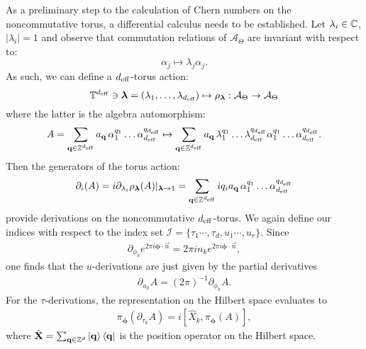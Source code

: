 \documentclass[
    aps,
    prb,
    twocolumn,
    floatfix,
    superscriptaddress,
	10pt
]{revtex4-2}
\begin{document}
As a preliminary step to the calculation of Chern numbers on the noncommutative torus, a differential calculus needs to be established.
Let $\lambda_i \in {\mathbb C}$, $|\lambda_i| =1$ and observe that commutation relations of $\mathcal{A}_\Theta$ are invariant with respect to:
\begin{equation}
\alpha_j \mapsto \lambda_j \alpha_j.
\end{equation}
As such, we can define a ${d_\mathrm{eff}}$-torus action:
\begin{equation}
{\mathbb T}^{d_\mathrm{eff}} \ni \bm \lambda=(\lambda_1,\ldots,\lambda_{d_\mathrm{eff}}) \mapsto \rho_{\bm \lambda}: \mathcal{A}_\Theta \to \mathcal{A}_\Theta
\end{equation}
where the latter is the algebra automorphism:
\begin{equation}
	A = \sum_{\mathbf{q} \in {\mathbb Z}^{{d_\mathrm{eff}}}} a_{\mathbf{q}}
	\, \alpha_1^{q_1} \ldots\alpha_{d_\mathrm{eff}}^{q_{d_\mathrm{eff}}}
	\mapsto  
	\sum_{\mathbf{q} \in {\mathbb Z}^{{d_\mathrm{eff}}}} a_{\mathbf{q}}
	\, 
	\lambda_1^{q_1} \ldots\lambda_{d_\mathrm{eff}}^{q_{d_\mathrm{eff}}}
	\alpha_1^{q_1} \ldots\alpha_{d_\mathrm{eff}}^{q_{d_\mathrm{eff}}} .
\end{equation}
Then the generators of the torus action:
\begin{equation}
\partial_i(A) = i \partial_{\lambda_i} \rho_{\bm \lambda}(A)|_{\bm \lambda \rightarrow 1}
=\sum_{\mathbf{q} \in {\mathbb Z}^{{d_\mathrm{eff}}}} i q_i a_{\mathbf{q}}
\, \alpha_1^{q_1} \ldots\alpha_{d_\mathrm{eff}}^{q_{d_\mathrm{eff}}}
\end{equation}
provide derivations on the noncommutative ${d_\mathrm{eff}}$-torus. 
We again define our indices with respect to the index set $\mathcal{I} = \lbrace \tau_1 \cdots, \tau_d, u_1  \cdots, u_r  \rbrace$.
Since
\begin{align}
	\partial_{\phi_k}  e^{2\pi i \boldsymbol{\phi} \cdot \vec{n}} = 2\pi  i n_k  e^{2 \pi i \boldsymbol{\phi} \cdot \vec{n}},
\end{align}
one finds that the $u$-derivations are just given by the partial derivatives
\begin{align}
	\partial_{u_k}  A 
	=  (2\pi)^{-1}\partial_{\phi_k}  A. 
\end{align}
For the $\tau$-derivations, the representation on the Hilbert space evaluates to
\begin{align}
	\pi_{\boldsymbol{\phi}} (\partial_{\tau_k} A) = i [ \hat{X}_k, \pi_{\boldsymbol{\phi}} (A)],
\end{align}
where $\hat{\mathbf{X}} = \sum_{\mathbf{q}\in \mathbb{Z}^d} \ket{\mathbf{q}} \bra{\mathbf{q}}$ is the position operator on the Hilbert space.
\end{document}
